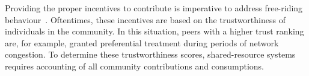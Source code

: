 




Providing the proper incentives to contribute is imperative to address free-riding behaviour~\cite{ma2004incentive}.
Oftentimes, these incentives are based on the trustworthiness of individuals in the community.
In this situation, peers with a higher trust ranking are, for example, granted preferential treatment during periods of network congestion.
To determine these trustworthiness scores, shared-resource systems requires accounting of all community contributions and consumptions.

